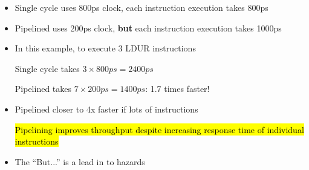 \newpage
\begin{frame}[fragile]
\iffalse
\ifnum\slides=1{\vspace*{-.2in}}\fi
\ifnum{}\fi
    \fi

  \begin{itemize}
  \item Single cycle uses 800ps clock, each instruction execution takes 800ps %
  \item Pipelined uses 200ps clock, \textbf{but} each instruction execution takes 1000ps %
    
  \item In this example, to execute 3 LDUR instructions

    Single cycle takes $3\times800ps=2400ps$

    Pipelined takes $7\times200ps=1400ps$: 1.7 times faster!
  \item Pipelined closer to 4x faster if lots of instructions

   \hl{ Pipelining improves throughput despite increasing response time of individual instructions}
    
\end{itemize}
  
  \BNotes\ifnum{}
\begin{itemize}
\item The ``But...'' is a lead in to hazards

\end{itemize}
\fi\ENotes
\end{frame}

